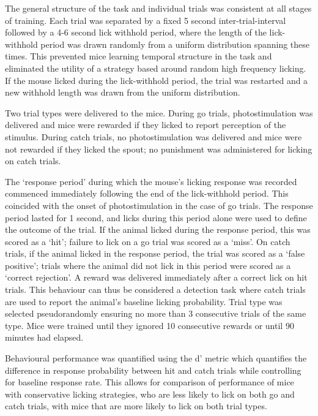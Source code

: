 The general structure of the task and individual trials was consistent at all stages of training. Each trial was separated by a fixed 5 second inter-trial-interval followed by a 4-6 second lick withhold period, where the length of the lick-withhold period was drawn randomly from a uniform distribution spanning these times. This prevented mice learning temporal structure in the task and eliminated the utility of a strategy based around random high frequency licking. If the mouse licked during the lick-withhold period, the trial was restarted and a new withhold length was drawn from the uniform distribution. 

Two trial types were delivered to the mice. During go trials, photostimulation was delivered and mice were rewarded if they licked to report perception of the stimulus. During catch trials, no photostimulation was delivered and mice were not rewarded if they licked the spout; no punishment was administered for licking on catch trials. 

The `response period' during which the mouse's licking response was recorded commenced immediately following the end of the lick-withhold period. This coincided with the onset of photostimulation in the case of go trials. The response period lasted for 1 second, and licks during this period alone were used to define the outcome of the trial. If the animal licked during the response period, this was scored as a `hit'; failure to lick on a go trial was scored as a `miss'. On catch trials, if the animal licked in the response period, the trial was scored as a `false positive'; trials where the animal did not lick in this period were scored as a `correct rejection'. A reward was delivered immediately after a correct lick on hit trials. This behaviour can thus be considered a detection task where catch trials are used to report the animal's baseline licking probability. Trial type was selected pseudorandomly ensuring no more than 3 consecutive trials of the same type. Mice were trained until they ignored 10 consecutive rewards or until 90 minutes had elapsed.

Behavioural performance was quantified using the d' metric \cite{brophy_alternatives_1986} which quantifies the difference in response probability between hit and catch trials while controlling for baseline response rate. This allows for comparison of performance of mice with conservative licking strategies, who are less likely to lick on both go and catch trials, with mice that are more likely to lick on both trial types.

